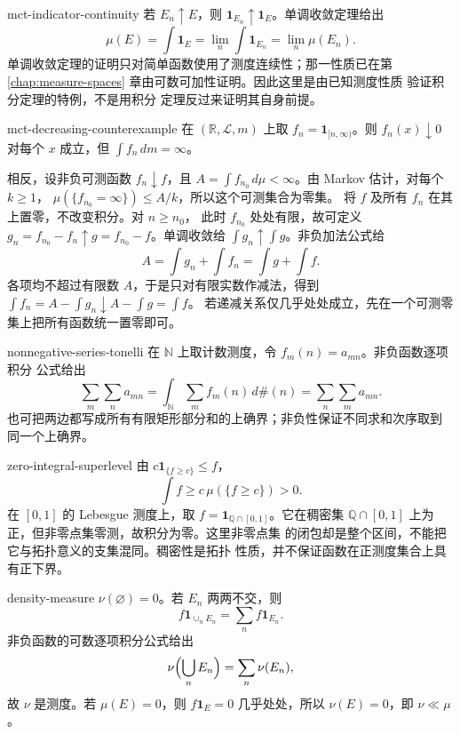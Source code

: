 \begin{solution}{mct-indicator-continuity}
若 \(E_n\uparrow E\)，则
\(\mathbf1_{E_n}\uparrow\mathbf1_E\)。单调收敛定理给出
\[
 \mu(E)=\int\mathbf1_E
 =\lim_n\int\mathbf1_{E_n}=\lim_n\mu(E_n).
\]
单调收敛定理的证明只对简单函数使用了测度连续性；那一性质已在第
\ref{chap:measure-spaces} 章由可数可加性证明。因此这里是由已知测度性质
验证积分定理的特例，不是用积分
定理反过来证明其自身前提。
\end{solution}

\begin{solution}{mct-decreasing-counterexample}
在 \((\mathbb R,\mathcal L,m)\) 上取
\(f_n=\mathbf1_{[n,\infty)}\)。则 \(f_n(x)\downarrow0\) 对每个 \(x\)
成立，但 \(\int f_n\,dm=\infty\)。

相反，设非负可测函数 \(f_n\downarrow f\)，且
\(A=\int f_{n_0}\,d\mu<\infty\)。由 Markov 估计，对每个 \(k\ge1\)，
\(\mu(\{f_{n_0}=\infty\})\le A/k\)，所以这个可测集合为零集。
将 \(f\) 及所有 \(f_n\) 在其上置零，不改变积分。对 \(n\ge n_0\)，
此时 \(f_{n_0}\) 处处有限，故可定义
\(g_n=f_{n_0}-f_n\uparrow g=f_{n_0}-f\)。单调收敛给
\(\int g_n\uparrow\int g\)。非负加法公式给
\[
 A=\int g_n+\int f_n=\int g+\int f.
\]
各项均不超过有限数 \(A\)，于是只对有限实数作减法，得到
\(\int f_n=A-\int g_n\downarrow A-\int g=\int f\)。
若递减关系仅几乎处处成立，先在一个可测零集上把所有函数统一置零即可。
\end{solution}

\begin{solution}{nonnegative-series-tonelli}
在 \(\mathbb N\) 上取计数测度，令 \(f_m(n)=a_{mn}\)。非负函数逐项积分
公式给出
\[
 \sum_m\sum_na_{mn}
 =\int_{\mathbb N}\sum_m f_m(n)\,d\#(n)
 =\sum_n\sum_ma_{mn}.
\]
也可把两边都写成所有有限矩形部分和的上确界；非负性保证不同求和次序取到
同一个上确界。
\end{solution}

\begin{solution}{zero-integral-superlevel}
由 \(c\mathbf1_{\{f\ge c\}}\le f\)，
\[
 \int f\ge c\,\mu(\{f\ge c\})>0.
\]
在 \([0,1]\) 的 Lebesgue 测度上，取
\(f=\mathbf1_{\mathbb Q\cap[0,1]}\)。它在稠密集
\(\mathbb Q\cap[0,1]\) 上为正，但非零点集零测，故积分为零。这里非零点集
的闭包却是整个区间，不能把它与拓扑意义的支集混同。稠密性是拓扑
性质，并不保证函数在正测度集合上具有正下界。
\end{solution}

\begin{solution}{density-measure}
\(\nu(\varnothing)=0\)。若 \(E_n\) 两两不交，则
\[
 f\mathbf1_{\cup_nE_n}=\sum_nf\mathbf1_{E_n}.
\]
非负函数的可数逐项积分公式给出
\[
 \nu\Bigl(\bigcup_nE_n\Bigr)=\sum_n\nu(E_n),
\]
故 \(\nu\) 是测度。若 \(\mu(E)=0\)，则
\(f\mathbf1_E=0\) 几乎处处，所以 \(\nu(E)=0\)，即 \(\nu\ll\mu\)。
\end{solution}

